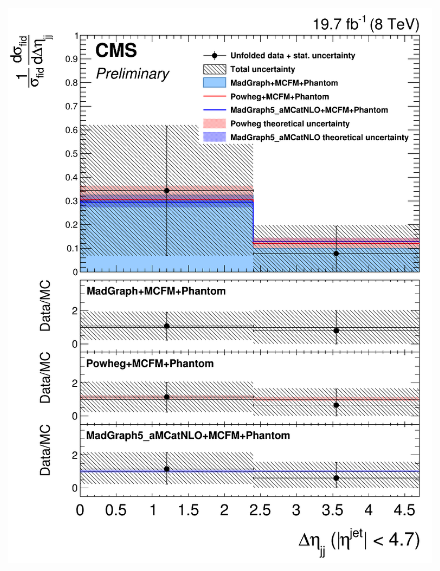 \begin{figure}[hbtp]
\begin{center}
    \includegraphics[width=\cmsFigWidth]{Figures/DiffCrossSecZZTo4eDeta_Unfolded_fr_MadGraph_norm.png}     

\end{center}
\end{figure}

